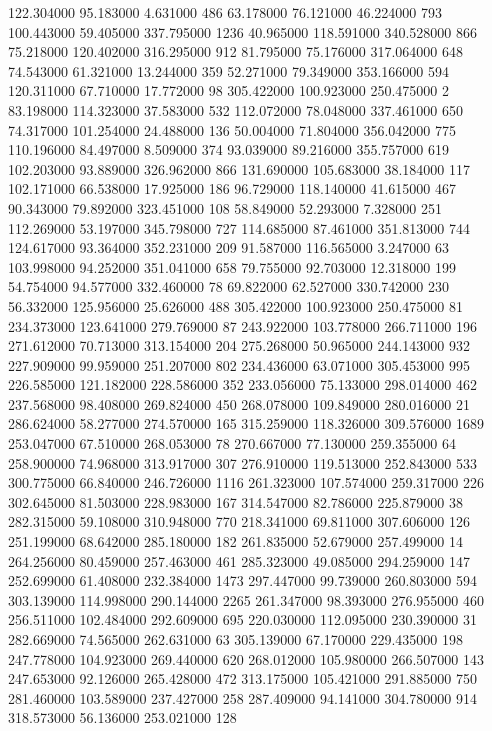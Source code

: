 122.304000	95.183000	4.631000	486
63.178000	76.121000	46.224000	793
100.443000	59.405000	337.795000	1236
40.965000	118.591000	340.528000	866
75.218000	120.402000	316.295000	912
81.795000	75.176000	317.064000	648
74.543000	61.321000	13.244000	359
52.271000	79.349000	353.166000	594
120.311000	67.710000	17.772000	98
305.422000	100.923000	250.475000	2
83.198000	114.323000	37.583000	532
112.072000	78.048000	337.461000	650
74.317000	101.254000	24.488000	136
50.004000	71.804000	356.042000	775
110.196000	84.497000	8.509000	374
93.039000	89.216000	355.757000	619
102.203000	93.889000	326.962000	866
131.690000	105.683000	38.184000	117
102.171000	66.538000	17.925000	186
96.729000	118.140000	41.615000	467
90.343000	79.892000	323.451000	108
58.849000	52.293000	7.328000	251
112.269000	53.197000	345.798000	727
114.685000	87.461000	351.813000	744
124.617000	93.364000	352.231000	209
91.587000	116.565000	3.247000	63
103.998000	94.252000	351.041000	658
79.755000	92.703000	12.318000	199
54.754000	94.577000	332.460000	78
69.822000	62.527000	330.742000	230
56.332000	125.956000	25.626000	488
305.422000	100.923000	250.475000	81
234.373000	123.641000	279.769000	87
243.922000	103.778000	266.711000	196
271.612000	70.713000	313.154000	204
275.268000	50.965000	244.143000	932
227.909000	99.959000	251.207000	802
234.436000	63.071000	305.453000	995
226.585000	121.182000	228.586000	352
233.056000	75.133000	298.014000	462
237.568000	98.408000	269.824000	450
268.078000	109.849000	280.016000	21
286.624000	58.277000	274.570000	165
315.259000	118.326000	309.576000	1689
253.047000	67.510000	268.053000	78
270.667000	77.130000	259.355000	64
258.900000	74.968000	313.917000	307
276.910000	119.513000	252.843000	533
300.775000	66.840000	246.726000	1116
261.323000	107.574000	259.317000	226
302.645000	81.503000	228.983000	167
314.547000	82.786000	225.879000	38
282.315000	59.108000	310.948000	770
218.341000	69.811000	307.606000	126
251.199000	68.642000	285.180000	182
261.835000	52.679000	257.499000	14
264.256000	80.459000	257.463000	461
285.323000	49.085000	294.259000	147
252.699000	61.408000	232.384000	1473
297.447000	99.739000	260.803000	594
303.139000	114.998000	290.144000	2265
261.347000	98.393000	276.955000	460
256.511000	102.484000	292.609000	695
220.030000	112.095000	230.390000	31
282.669000	74.565000	262.631000	63
305.139000	67.170000	229.435000	198
247.778000	104.923000	269.440000	620
268.012000	105.980000	266.507000	143
247.653000	92.126000	265.428000	472
313.175000	105.421000	291.885000	750
281.460000	103.589000	237.427000	258
287.409000	94.141000	304.780000	914
318.573000	56.136000	253.021000	128
